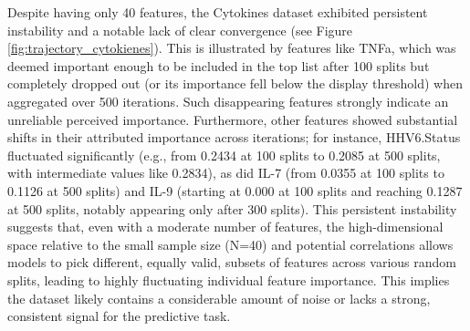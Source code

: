 \documentclass[12pt,a4paper]{report}
\begin{document}
\noindent
Despite having only 40 features, the Cytokines dataset exhibited persistent instability and a notable lack of clear convergence (see Figure \ref{fig:trajectory_cytokienes}). This is illustrated by features like TNFa, which was deemed important enough to be included in the top list after 100 splits but completely dropped out (or its importance fell below the display threshold) when aggregated over 500 iterations. Such disappearing features strongly indicate an unreliable perceived importance. Furthermore, other features showed substantial shifts in their attributed importance across iterations; for instance, HHV6.Status fluctuated significantly (e.g., from 0.2434 at 100 splits to 0.2085 at 500 splits, with intermediate values like 0.2834), as did IL-7 (from 0.0355 at 100 splits to 0.1126 at 500 splits) and IL-9 (starting at 0.000 at 100 splits and reaching 0.1287 at 500 splits, notably appearing only after 300 splits). This persistent instability suggests that, even with a moderate number of features, the high-dimensional space relative to the small sample size (N=40) and potential correlations allows models to pick different, equally valid, subsets of features across various random splits, leading to highly fluctuating individual feature importance. This implies the dataset likely contains a considerable amount of noise or lacks a strong, consistent signal for the predictive task.
\end{document}
